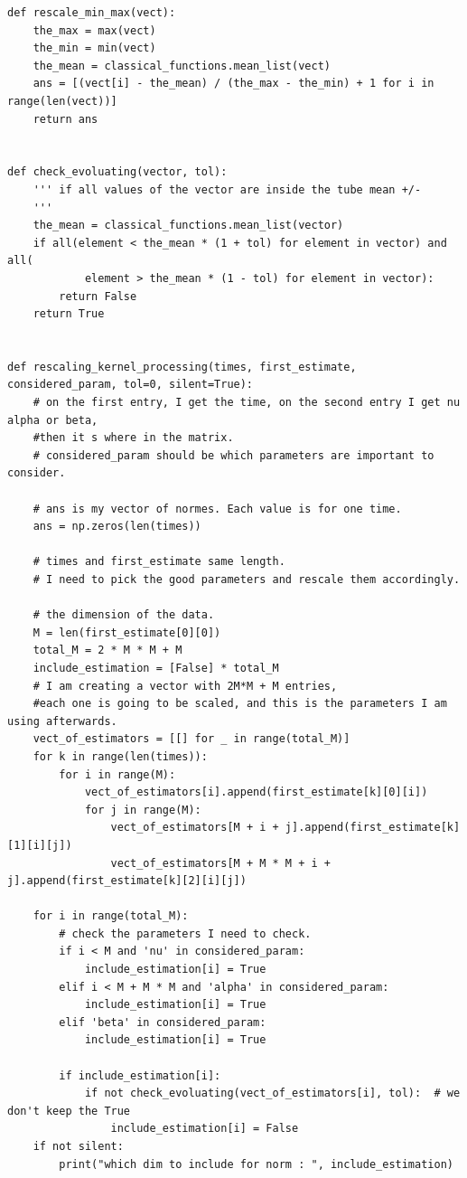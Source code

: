 \begin{Verbatim}[fontsize=\footnotesize]
def rescale_min_max(vect):
    the_max = max(vect)
    the_min = min(vect)
    the_mean = classical_functions.mean_list(vect)
    ans = [(vect[i] - the_mean) / (the_max - the_min) + 1 for i in range(len(vect))]
    return ans


def check_evoluating(vector, tol):
    ''' if all values of the vector are inside the tube mean +/- 
    '''
    the_mean = classical_functions.mean_list(vector)
    if all(element < the_mean * (1 + tol) for element in vector) and all(
            element > the_mean * (1 - tol) for element in vector):
        return False
    return True


def rescaling_kernel_processing(times, first_estimate, considered_param, tol=0, silent=True):
    # on the first entry, I get the time, on the second entry I get nu alpha or beta, 
    #then it s where in the matrix.
    # considered_param should be which parameters are important to consider.

    # ans is my vector of normes. Each value is for one time.
    ans = np.zeros(len(times))

    # times and first_estimate same length.
    # I need to pick the good parameters and rescale them accordingly.

    # the dimension of the data.
    M = len(first_estimate[0][0])
    total_M = 2 * M * M + M
    include_estimation = [False] * total_M
    # I am creating a vector with 2M*M + M entries,
    #each one is going to be scaled, and this is the parameters I am using afterwards.
    vect_of_estimators = [[] for _ in range(total_M)]
    for k in range(len(times)):
        for i in range(M):
            vect_of_estimators[i].append(first_estimate[k][0][i])
            for j in range(M):
                vect_of_estimators[M + i + j].append(first_estimate[k][1][i][j])
                vect_of_estimators[M + M * M + i + j].append(first_estimate[k][2][i][j])

    for i in range(total_M):
        # check the parameters I need to check.
        if i < M and 'nu' in considered_param:
            include_estimation[i] = True
        elif i < M + M * M and 'alpha' in considered_param:
            include_estimation[i] = True
        elif 'beta' in considered_param:
            include_estimation[i] = True

        if include_estimation[i]:
            if not check_evoluating(vect_of_estimators[i], tol):  # we don't keep the True
                include_estimation[i] = False
    if not silent:
        print("which dim to include for norm : ", include_estimation)


\end{Verbatim}
